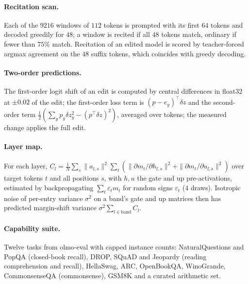 \documentclass{article}
\theoremstyle{definition}\newtheorem{law}{Empirical law}
\begin{document}
\paragraph{Recitation scan.} Each of the $9216$ windows of $112$ tokens is prompted with its first $64$ tokens and decoded greedily for $48$; a window is recited if all $48$ tokens match, ordinary if fewer than $75\%$ match. Recitation of an edited model is scored by teacher-forced argmax agreement on the $48$ suffix tokens, which coincides with greedy decoding.

\paragraph{Two-order predictions.} The first-order logit shift of an edit is computed by central differences in float32 at $\pm0.02$ of the edit; the first-order loss term is $(p-e_y)^\top\delta z$ and the second-order term $\tfrac12(\sum_yp_y\delta z_y^2-(p^\top\delta z)^2)$, averaged over tokens; the measured change applies the full edit.

\paragraph{Layer map.} For each layer, $C_l=\frac1{N}\sum_s\|a_{l,s}\|^2\sum_t(\|\partial m_t/\partial h_{l,s}\|^2+\|\partial m_t/\partial u_{l,s}\|^2)$ over target tokens $t$ and all positions $s$, with $h,u$ the gate and up pre-activations, estimated by backpropagating $\sum_t\varepsilon_tm_t$ for random signs $\varepsilon_t$ ($4$ draws). Isotropic noise of per-entry variance $\sigma^2$ on a band's gate and up matrices then has predicted margin-shift variance $\sigma^2\sum_{l\in\text{band}}C_l$.

\paragraph{Capability suite.} Twelve tasks from olmo-eval with capped instance counts: NaturalQuestions and PopQA (closed-book recall), DROP, SQuAD and Jeopardy (reading comprehension and recall), HellaSwag, ARC, OpenBookQA, WinoGrande, CommonsenseQA (commonsense), GSM8K and a curated arithmetic set.
\end{document}
